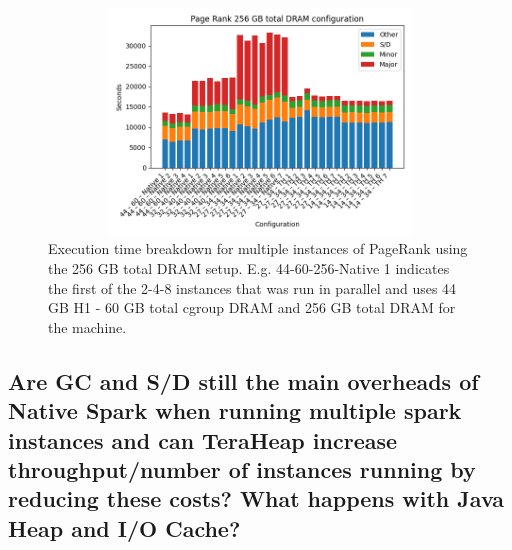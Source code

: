 \begin{figure}[ht]
        \includegraphics[width=13cm,height=6cm]{./fig/pr256.png}
    \caption{Execution time breakdown for multiple instances of
    PageRank using the 256 GB total DRAM setup. E.g. 44-60-256-Native
    1 indicates the first of the 2-4-8 instances that was run in
    parallel and uses 44 GB H1 - 60 GB total cgroup DRAM and 256 GB
    total DRAM for the machine.}
	\label{fig:pr256}
\end{figure}

\subsection{Are GC and S/D still the main overheads of Native Spark
when running multiple spark instances and can TeraHeap increase
throughput/number of instances running by reducing these costs? What
happens with Java Heap and I/O Cache?}


